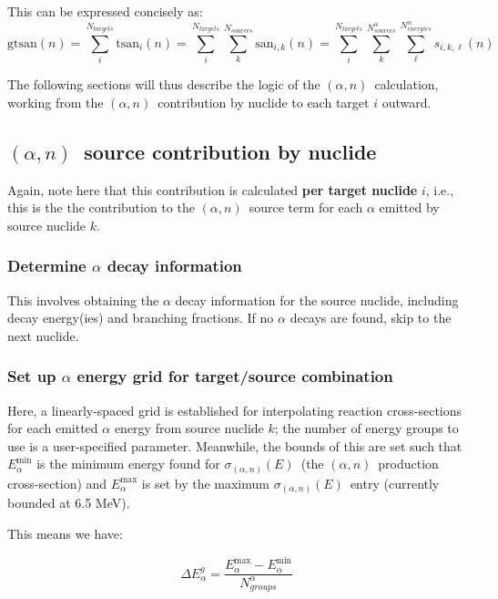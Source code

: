 \documentclass[10pt]{article}
\newcommand{\alphn}[0]{$\left(\alpha,n\right)$}
\newcommand{\sigan}[0]{\sigma_{\left(\alpha,n\right)}}
\begin{document}
This can be expressed concisely as:
\begin{equation}
\displaystyle \mathrm{gtsan}\left(n\right) = \sum_{i}^{N_{targets}} \mathrm{tsan}_i(n) = \sum_{i}^{N_{targets}} \sum_{k}^{N_{sources}} \mathrm{san}_{i,k}(n) = \sum_{i}^{N_{targets}} \sum_{k}^{N^\alpha_{sources}} \sum_{\ell}^{N^\alpha_{energies}} s_{i,k,\ell}(n)
\end{equation}

The following sections will thus describe the logic of the \alphn\ calculation, working from the \alphn\ contribution by nuclide to each target $i$ outward.

\subsection{\alphn\ source contribution by nuclide}
Again, note here that this contribution is calculated \textbf{per target nuclide} $i$, i.e., this is the the contribution to the \alphn\ source term for each $\alpha$ emitted by source nuclide $k$.

\subsubsection{Determine $\alpha$ decay information}

This involves obtaining the $\alpha$ decay information for the source nuclide, including decay energy(ies) and branching fractions. If no $\alpha$ decays are found, skip to the next nuclide.

\subsubsection{Set up $\alpha$ energy grid for target/source combination}
Here, a linearly-spaced grid is established for interpolating reaction cross-sections for each emitted $\alpha$ energy from source nuclide $k$; the number of energy groups to use is a user-specified parameter. Meanwhile, the bounds of this are set such that $E_\alpha^{\min}$ is the minimum energy found for $\sigan\left(E\right)$\ (the \alphn\ production cross-section) and $E_\alpha^{\max}$ is set by the maximum $\sigan\left(E\right)$\ entry (currently bounded at 6.5 MeV).

This means we have:

\begin{equation}
\Delta E_\alpha^g = \frac{E_\alpha^{\max} - E_\alpha^{\min} }{N^\alpha_{groups}}
\end{equation}
\end{document}

